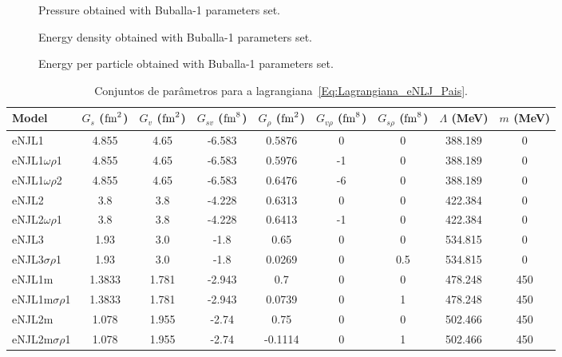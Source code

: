 \documentclass[prc, reprint, amsmath, floatfix, linenumbers,10pt]{revtex4-1}
\begin{document}
\begin{figure}
	
	\caption{Pressure obtained with Buballa-1 parameters set. \label{Fig:Ex_pressure}}
\end{figure}

\begin{figure}
	
	\caption{Energy density obtained with Buballa-1 parameters set. \label{Fig:Ex_pressure}}
\end{figure}

\begin{figure}
	
	\caption{Energy per particle obtained with Buballa-1 parameters set. \label{Fig:Ex_pressure}}
\end{figure}

\begin{table*}
\caption{Conjuntos de parâmetros para a lagrangiana~\eqref{Eq:Lagrangiana_eNLJ_Pais}\cite{Pais2016}. \label{Tab:Parametros_eNJL}}
\begin{ruledtabular}
\begin{tabular}{lcccccccc}
Model & $G_s$ ($\rm{fm}^2$) & $G_v$ ($\rm{fm}^2$) & $G_{sv}$ ($\rm{fm}^8$) & $G_\rho$ ($\rm{fm}^2$) & $G_{v\rho}$ ($\rm{fm}^8$) & $G_{s\rho}$ ($\rm{fm}^8$) & $\Lambda$ (MeV) & $m$ (MeV) \\
\hline
eNJL1 & 4.855 & 4.65 & -6.583 & 0.5876 & 0 & 0 & 388.189 & 0 \\
eNJL1$\omega\rho$1 & 4.855 & 4.65 & -6.583 & 0.5976 & -1 & 0 & 388.189 & 0 \\
eNJL1$\omega\rho$2 & 4.855 & 4.65 & -6.583 & 0.6476 & -6 & 0 & 388.189 & 0 \\
eNJL2 & 3.8 & 3.8 & -4.228 & 0.6313 & 0 & 0 & 422.384 & 0 \\
eNJL2$\omega\rho$1 & 3.8 & 3.8 & -4.228 & 0.6413 & -1 & 0 & 422.384 & 0 \\
eNJL3 & 1.93 & 3.0 & -1.8 & 0.65 & 0 & 0 & 534.815 & 0 \\
eNJL3$\sigma\rho$1 & 1.93 & 3.0 & -1.8 & 0.0269 & 0 & 0.5 & 534.815 & 0 \\
eNJL1m & 1.3833 & 1.781 & -2.943 & 0.7 & 0 & 0 & 478.248 & 450 \\
eNJL1m$\sigma\rho$1 & 1.3833 & 1.781 & -2.943 & 0.0739 & 0 & 1 & 478.248 & 450 \\
eNJL2m & 1.078 & 1.955 & -2.74 & 0.75 & 0 & 0 & 502.466 & 450 \\
eNJL2m$\sigma\rho$1 & 1.078 & 1.955 & -2.74 & -0.1114 & 0 & 1 & 502.466 & 450 \\
\end{tabular}
\end{ruledtabular}
\end{table*}
\end{document}
